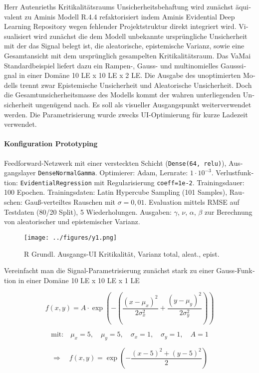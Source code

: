 \begin{otherlanguage}{ngerman}
Herr Autenrieths Kritikalitätsraums Unsicherheitsbehaftung wird zunächst äquivalent zu Aminis Modell R.4.4 refaktorisiert indem Aminis Evidential Deep Learning Repository wegen fehlender Projektstruktur direkt integriert wird. Visualisiert wird zunächst die dem Modell unbekannte ursprüngliche Unsicherheit mit der das Signal belegt ist, die aleatorische, epistemische Varianz, sowie eine Gesamtansicht mit dem ursprünglich gesampelten Kritikalitätsraum. Das VaMai Standardbeispiel liefert dazu ein Rampen-, Gauss- und multinomielles Gausssignal in einer Domäne 10 LE x 10 LE x 2 LE. Die Ausgabe des unoptimierten Modells trennt zwar \gls{Epistemische Unsicherheit} und \gls{Aleatorische Unsicherheit}. Doch die Gesamtunsicherheitsmasse des Modells kommt der wahren unterliegenden Unsicherheit ungenügend nach. Es soll als visueller Ausgangspunkt weiterverwendet werden. Die Parametrisierung wurde zwecks UI-Optimierung für kurze Ladezeit verwendet.

\paragraph{Konfiguration \glqq Prototyping \grqq} Feedforward-Netzwerk mit einer versteckten Schicht (\texttt{Dense(64, relu)}), Ausgangslayer \texttt{DenseNormalGamma}. Optimierer: Adam, Lernrate: $1\cdot10^{-3}$. Verlustfunktion: \texttt{EvidentialRegression} mit Regularisierung \texttt{coeff=1e-2}. Trainingsdauer: 100 Epochen. Trainingsdaten: Latin Hypercube Sampling (101 Samples), Rauschen: Gauß-verteiltes Rauschen mit $\sigma = 0{,}01$. Evaluation mittels RMSE auf Testdaten (80/20 Split), 5 Wiederholungen. Ausgaben: $\gamma$, $\nu$, $\alpha$, $\beta$ zur Berechnung von aleatorischer und epistemischer Varianz.

\begin{figure}[!ht]
  \centering
  \texttt{[image: ../figures/y1.png]}
  \caption{R Grundl. Ausgangs-UI Kritikalität, Varianz total, aleat., epist.}
\end{figure}

Vereinfacht man die Signal-Parametrisierung zunächst stark zu einer Gauss-Funktion in einer Domäne 10 LE x 10 LE x 1 LE

\[
f(x, y) = A \cdot \exp\left( -\left( \frac{(x - \mu_x)^2}{2\sigma_x^2} + \frac{(y - \mu_y)^2}{2\sigma_y^2} \right) \right)
\]

\[
\text{mit:} \quad \mu_x = 5,\quad \mu_y = 5,\quad \sigma_x = 1,\quad \sigma_y = 1,\quad A = 1
\]

\[
\Rightarrow \quad f(x, y) = \exp\left( -\frac{(x - 5)^2 + (y - 5)^2}{2} \right)
\]


\end{otherlanguage}
